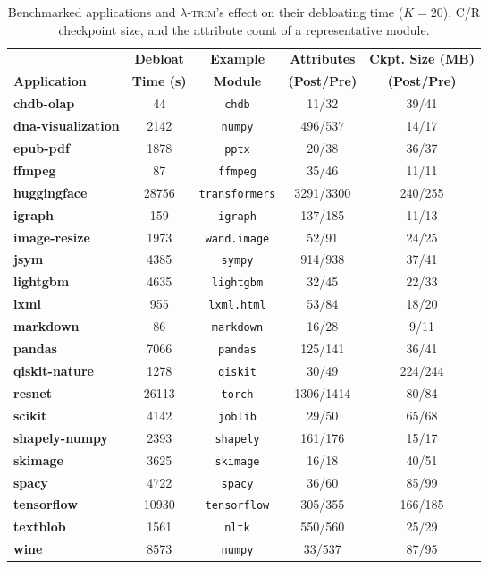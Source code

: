 \documentclass[sigplan,nonacm]{acmart}
\newcommand{\sys}{\textsc{\ensuremath{\lambda}-trim}\xspace}
\newcommand{\application}[1]{{\textcolor{pennblue}{\textbf{#1}}}}
\newcommand{\module}[1]{{\texttt{#1}}}
\begin{document}
\begin{table}[t]
    \centering
    \setlength{\tabcolsep}{3pt}
    \scriptsize
        \begin{tabularx}{\columnwidth}{Xcccc}
        \toprule
        & \textbf{Debloat} & \textbf{Example} & \textbf{Attributes} & \textbf{Ckpt. Size (MB)} \\
\textbf{Application}  & \textbf{Time (s)} & \textbf{Module} & \textbf{(Post/Pre)} & \textbf{(Post/Pre)}\\
        \midrule
        \application{chdb-olap} & 44 & \module{chdb} & 11/32 & 39/41 \\
        \application{dna-visualization} & 2142 & \module{numpy} & 496/537 & 14/17 \\
        \application{epub-pdf} & 1878 & \module{pptx} & 20/38 & 36/37 \\
        \application{ffmpeg} & 87 & \module{ffmpeg} & 35/46 & 11/11 \\
        \application{huggingface} & 28756 & \module{transformers} & 3291/3300 & 240/255 \\
        \application{igraph} & 159 & \module{igraph} & 137/185 & 11/13 \\
        \application{image-resize} & 1973 & \module{wand.image} & 52/91 & 24/25 \\
        \application{jsym} & 4385 & \module{sympy} & 914/938 & 37/41 \\
        \application{lightgbm} & 4635 & \module{lightgbm} & 32/45 & 22/33 \\
        \application{lxml} & 955 & \module{lxml.html} & 53/84 & 18/20 \\
        \application{markdown} & 86 & \module{markdown} & 16/28 & 9/11 \\
        \application{pandas} & 7066 & \module{pandas} & 125/141 & 36/41 \\
        \application{qiskit-nature} & 1278 & \module{qiskit} & 30/49 & 224/244 \\
        \application{resnet} & 26113 & \module{torch} & 1306/1414 & 80/84 \\
        \application{scikit} & 4142 & \module{joblib} & 29/50 & 65/68 \\
        \application{shapely-numpy} & 2393 & \module{shapely} & 161/176 & 15/17 \\
        \application{skimage} & 3625 & \module{skimage} & 16/18 & 40/51 \\
        \application{spacy} & 4722 & \module{spacy} & 36/60 & 85/99 \\
        \application{tensorflow} & 10930 & \module{tensorflow} & 305/355 & 166/185 \\
        \application{textblob} & 1561 & \module{nltk} & 550/560 & 25/29 \\
        \application{wine} & 8573 & \module{numpy} & 33/537 & 87/95 \\
        \bottomrule
    \end{tabularx}
    \caption{Benchmarked applications and \sys's effect on their debloating time ($K=20$), C/R checkpoint size, and the attribute count of a representative module.
}
    \label{tab:debloating-time}
\end{table}  
\end{document}
